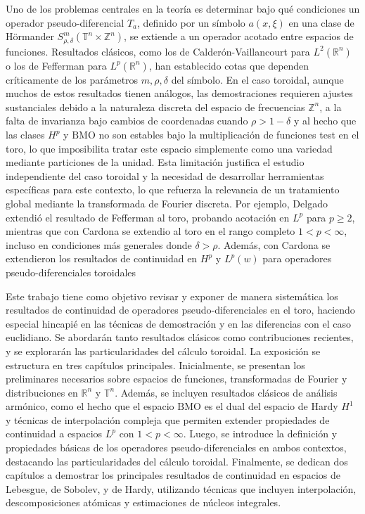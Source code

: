 Uno de los problemas centrales en la teoría es determinar bajo qué condiciones un operador pseudo-diferencial $T_a$, definido por un símbolo $a(x, \xi)$ en una clase de Hörmander $S^m_{\rho,\delta}(\mathbb{T}^n \times \mathbb{Z}^n)$, se extiende a un operador acotado entre espacios de funciones. Resultados clásicos, como los de Calderón-Vaillancourt para $L^2(\mathbb{R}^n)$ o los de Fefferman para $L^p(\mathbb{R}^n)$, han establecido cotas que dependen críticamente de los parámetros $m, \rho, \delta$ del símbolo. En el caso toroidal, aunque muchos de estos resultados tienen análogos, las demostraciones requieren ajustes sustanciales debido a la naturaleza discreta del espacio de frecuencias $\mathbb{Z}^n$, a la falta de invarianza bajo cambios de coordenadas cuando $\rho > 1 - \delta$ y al hecho que las clases $H^p$ y $\mathrm{BMO}$ no son estables bajo la multiplicación de funciones test en el toro, lo que imposibilita tratar este espacio simplemente como una variedad mediante particiones de la unidad. Esta limitación justifica el estudio independiente del caso toroidal y la necesidad de desarrollar herramientas específicas para este contexto, lo que refuerza la relevancia de un tratamiento global mediante la transformada de Fourier discreta.  Por ejemplo, Delgado extendió el resultado de Fefferman al toro, probando acotación en $L^p$ para $p \geq 2$, mientras que con Cardona se extendio al toro en el rango completo $1 < p < \infty$, incluso en condiciones más generales donde $\delta > \rho$. Además, con Cardona se extendieron los resultados de continuidad en $H^p$ y $L^p(w)$ para operadores pseudo-diferenciales toroidales 

Este trabajo tiene como objetivo revisar y exponer de manera sistemática los resultados de continuidad de operadores pseudo-diferenciales en el toro, haciendo especial hincapié en las técnicas de demostración y en las diferencias con el caso euclidiano. Se abordarán tanto resultados clásicos como contribuciones recientes, y se explorarán las particularidades del cálculo toroidal. La exposición se estructura en tres capítulos principales. Inicialmente, se presentan los preliminares necesarios sobre espacios de funciones, transformadas de Fourier y distribuciones en $\mathbb{R}^n$ y $\mathbb{T}^n$. Además, se incluyen resultados clásicos de análisis armónico, como el hecho que el espacio $\mathrm{BMO}$ es el dual del espacio de Hardy $H^1$ y técnicas de interpolación compleja que permiten extender propiedades de continuidad a espacios $L^p$ con $1 < p < \infty$. Luego, se introduce la definición y propiedades básicas de los operadores pseudo-diferenciales en ambos contextos, destacando las particularidades del cálculo toroidal. Finalmente, se dedican dos capítulos a demostrar los principales resultados de continuidad en espacios de Lebesgue, de Sobolev, y de Hardy, utilizando técnicas que incluyen interpolación, descomposiciones atómicas y estimaciones de núcleos integrales.

